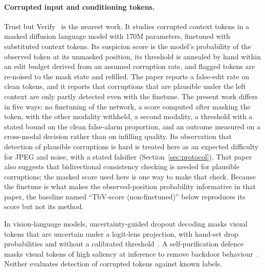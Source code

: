\paragraph{Corrupted input and conditioning tokens.}
Trust but Verify~\citep{jhingran2026trustverify} is the nearest work.
It studies corrupted context tokens in a masked diffusion language model with 170M parameters, finetuned with substituted
context tokens.
Its suspicion score is the model's probability of the observed token at its unmasked position, its threshold is annealed
by hand within an edit budget derived from an assumed corruption rate, and flagged tokens are re-noised to the mask state and
refilled.
The paper reports a false-edit rate on clean tokens, and it reports that corruptions that are plausible under the left
context are only partly detected even with the finetune.
The present work differs in five ways: no finetuning of the network, a score computed after masking the token, with the
other modality withheld, a second modality, a threshold with a stated bound on the clean false-alarm proportion, and an outcome
measured on a cross-modal decision rather than on infilling quality.
Its observation that detection of plausible corruptions is hard is treated here as an expected difficulty for JPEG and noise,
with a stated falsifier (Section~\ref{sec:protocol}).
That paper also suggests that bidirectional consistency checking is needed for plausible corruptions; the masked score used
here is one way to make that check.
Because the finetune is what makes the observed-position probability informative in that paper, the baseline named
``TbV-score (non-finetuned)'' below reproduces its score but not its method.

In vision-language models, uncertainty-guided dropout decoding masks visual tokens that are uncertain under a
logit-lens projection, with hand-set drop probabilities and without a calibrated threshold~\citep{fang2025dropout}.
A self-purification defence masks visual tokens of high saliency at inference to remove backdoor behaviour~\citep{wan2026disp}.
Neither evaluates detection of corrupted tokens against known labels.

